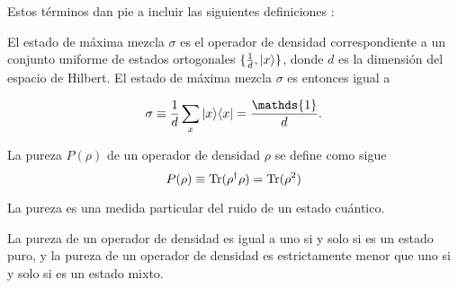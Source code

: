 Estos términos dan pie a incluir las siguientes definiciones {\cite{wilde2011classical}}:

\begin{definition} El estado de máxima mezcla $\sigma$ es el operador de densidad correspondiente a un conjunto uniforme de estados ortogonales $\{\frac{1}{d},|x\rangle\}$, donde $d$ es la dimensión del espacio de Hilbert. El estado de máxima mezcla $\sigma$ es entonces igual a
	
	
	\begin{equation}\label{maximallyMixedState}
		\sigma \equiv \dfrac{1}{d}\sum_x|x\rala x|=\dfrac{\mathds{1}}{d}.
	\end{equation}
\end{definition}


\begin{definition} La pureza $P(\rho)$ de un operador de densidad $\rho$ se define como sigue {\cite{wilde2011classical}}
\begin{equation}
	P(\rho)\equiv{\rm Tr}(\rho^\dagger\rho)={\rm Tr}(\rho^2)
\end{equation}

	\end{definition}

La pureza es una medida particular del ruido de un estado cuántico.

\begin{proposition}
	La pureza de un operador de densidad es igual a uno si y solo si es un estado puro, y la pureza de un operador de densidad es estrictamente menor que uno si y solo si es un estado mixto.
	\end{proposition}


